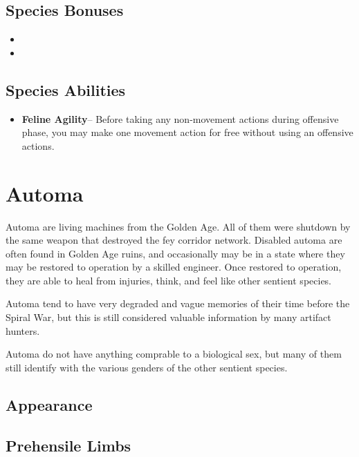 {\subsection*{Species Bonuses}

\begin{itemize}
	\item {}
	\item {}
\end{itemize}

\subsection*{Species Abilities}

\begin{itemize}
	\item \textbf{Feline Agility}-- Before taking any non-movement actions during offensive phase, you may make one movement action for free without using an offensive actions.
\end{itemize}

\GRPpagebreak
\section{Automa}

Automa are living machines from the Golden Age. All of them were shutdown by the same weapon that destroyed the fey corridor network. Disabled automa are often found in Golden Age ruins, and occasionally may be in a state where they may be restored to operation by a skilled engineer. Once restored to operation, they are able to heal from injuries, think, and feel like other sentient species.

Automa tend to have very degraded and vague memories of their time before the Spiral War, but this is still considered valuable information by many artifact hunters.

Automa do not have anything comprable to a biological sex, but many of them still identify with the various genders of the other sentient species.

\subsection*{Appearance}

\subsection*{Prehensile Limbs}

}

